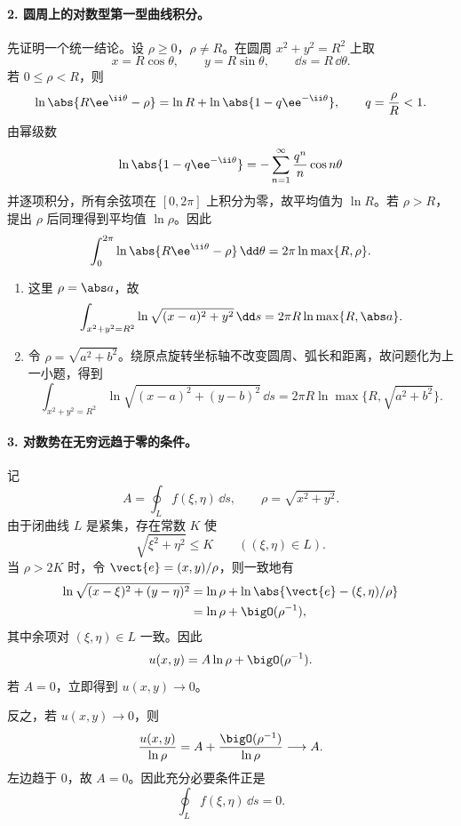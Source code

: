 \paragraph{2. 圆周上的对数型第一型曲线积分。}
\begin{xsolution}
先证明一个统一结论。设 $\rho\ge0$，$\rho\ne R$。在圆周 $x^2+y^2=R^2$ 上取
\[
  x=R\cos\theta,\qquad y=R\sin\theta,
  \qquad \dd s=R\,\dd\theta.
\]
若 $0\le\rho<R$，则
\[
  \ln\abs{R\ee^{\ii\theta}-\rho}
  =\ln R+\ln\abs{1-q\ee^{-\ii\theta}},
  \qquad q=\frac\rho R<1.
\]
由幂级数
\[
  \ln\abs{1-q\ee^{-\ii\theta}}
  =-\sum_{n=1}^{\infty}\frac{q^n}{n}\cos n\theta
\]
并逐项积分，所有余弦项在 $[0,2\pi]$ 上积分为零，故平均值为 $\ln R$。若 $\rho>R$，提出 $\rho$ 后同理得到平均值 $\ln\rho$。因此
\[
  \int_0^{2\pi}\ln\abs{R\ee^{\ii\theta}-\rho}\,\dd\theta
  =2\pi\ln\max\{R,\rho\}.
\]

\begin{enumerate}[label=(\arabic*)]
\item 这里 $\rho=\abs a$，故
\[
  \int_{x^2+y^2=R^2}
  \ln\sqrt{(x-a)^2+y^2}\,\dd s
  =2\pi R\ln\max\{R,\abs a\}.
\]

\item 令 $\rho=\sqrt{a^2+b^2}$。绕原点旋转坐标轴不改变圆周、弧长和距离，故问题化为上一小题，得到
\[
  \int_{x^2+y^2=R^2}
  \ln\sqrt{(x-a)^2+(y-b)^2}\,\dd s
  =2\pi R\ln\max\{R,\sqrt{a^2+b^2}\}.
\]
\end{enumerate}
\end{xsolution}

\paragraph{3. 对数势在无穷远趋于零的条件。}
\begin{xsolution}
记
\[
  A=\oint_L f(\xi,\eta)\,\dd s,
  \qquad \rho=\sqrt{x^2+y^2}.
\]
由于闭曲线 $L$ 是紧集，存在常数 $K$ 使
\[
  \sqrt{\xi^2+\eta^2}\le K\qquad((\xi,\eta)\in L).
\]
当 $\rho>2K$ 时，令 $\vect{e}=(x,y)/\rho$，则一致地有
\begin{align*}
  \ln\sqrt{(x-\xi)^2+(y-\eta)^2}
  &=\ln\rho+
    \ln\abs{\vect{e}-(\xi,\eta)/\rho}\\
  &=\ln\rho+\bigO(\rho^{-1}),
\end{align*}
其中余项对 $(\xi,\eta)\in L$ 一致。因此
\[
  u(x,y)=A\ln\rho+\bigO(\rho^{-1}).
\]
若 $A=0$，立即得到 $u(x,y)\to0$。

反之，若 $u(x,y)\to0$，则
\[
  \frac{u(x,y)}{\ln\rho}
  =A+\frac{\bigO(\rho^{-1})}{\ln\rho}\longrightarrow A.
\]
左边趋于 $0$，故 $A=0$。因此充分必要条件正是
\[
  \oint_L f(\xi,\eta)\,\dd s=0.
\]
\end{xsolution}


